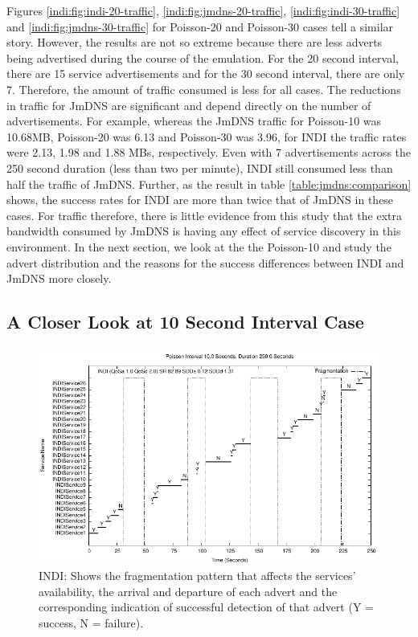 Figures \ref{indi:fig:indi-20-traffic}, \ref{indi:fig:jmdns-20-traffic}, \ref{indi:fig:indi-30-traffic} and \ref{indi:fig:jmdns-30-traffic} for Poisson-20 and Poisson-30 cases tell a similar story.  However, the results are not so extreme because there are less adverts being advertised during the course of the emulation.  For the 20 second interval, there are 15 service advertisements and for the 30 second interval, there are only 7. Therefore, the amount of traffic consumed is less for all cases.  The reductions in traffic for JmDNS are significant and depend directly on the number of advertisements. For example, whereas the JmDNS traffic for Poisson-10 was  10.68MB, Poisson-20 was 6.13 and Poisson-30 was 3.96, for INDI the traffic rates were 2.13, 1.98 and 1.88 MBs, respectively.  Even with 7 advertisements across the 250 second duration (less than two per minute), INDI still consumed less than half the traffic of JmDNS.  Further, as the result in table \ref{table:jmdns:comparison} shows, the success rates for INDI are more than twice that of JmDNS in these cases. For traffic therefore, there is little evidence from this study that the extra bandwidth consumed by JmDNS is having any effect of service discovery in this environment.  In the next section, we look at the the Poisson-10  and study the advert distribution and the reasons for the success differences between INDI and JmDNS more closely.


\subsection{A Closer Look at 10 Second Interval Case}   
\label{indi:sec:indepth}

\begin{figure}[htb]
\centering
\includegraphics[scale=1.0]{indi10-1-2-results-distribution.pdf}
\caption{INDI: Shows the fragmentation pattern that affects the services' availability, the arrival and departure of each advert and the corresponding indication of successful detection of that advert (Y = success, N = failure).} 
\label{indi:fig:poisson-10-1-2}
\end{figure}

